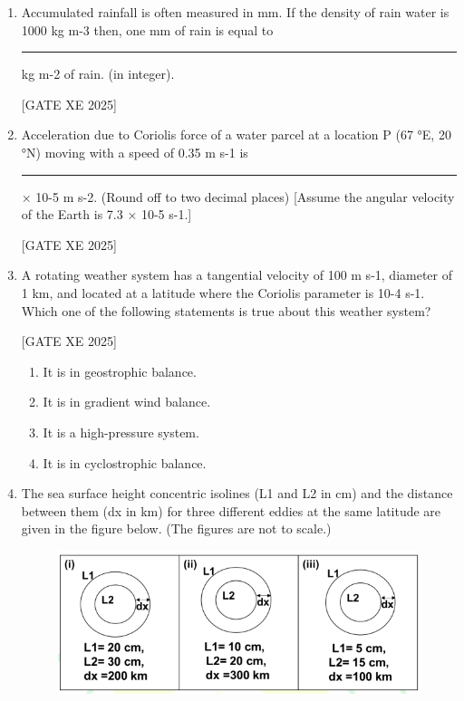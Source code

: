 \documentclass[journal,12pt,onecolumn]{IEEEtran}
\theoremstyle{remark}
\begin{document}
\begin{enumerate}
\hfill[GATE XE 2025]

\begin{multicols}{2}
\begin{enumerate}
\item 5 seconds
\item 20 seconds
\item 5 minutes
\item 2 minutes
\end{enumerate}
\end{multicols}

\item Accumulated rainfall is often measured in mm. If the density of rain water is 1000 kg m-3 then, one mm of rain is equal to \rule{3cm}{0.15mm} kg m-2 of rain. (in integer).

\hfill[GATE XE 2025]

\item Acceleration due to Coriolis force of a water parcel at a location P (67 °E, 20 °N) moving with a speed of 0.35 m s-1 is \rule{3cm}{0.15mm} × 10-5 m s-2. (Round off to two decimal places) [Assume the angular velocity of the Earth is 7.3 × 10-5 s-1.]

\hfill[GATE XE 2025]

\item A rotating weather system has a tangential velocity of 100 m s-1, diameter of 1 km, and located at a latitude where the Coriolis parameter is 10-4 s-1. Which one of the following statements is true about this weather system?

\hfill[GATE XE 2025]

\begin{multicols}{2}
\begin{enumerate}
\item It is in geostrophic balance.
\item It is in gradient wind balance.
\item It is a high-pressure system.
\item It is in cyclostrophic balance.
\end{enumerate}
\end{multicols}

\item The sea surface height concentric isolines (L1 and L2 in cm) and the distance between them (dx in km) for three different eddies at the same latitude are given in the figure below. (The figures are not to scale.)
\begin{figure}[H]
    \centering
    \includegraphics[width=0.5\columnwidth]{figs/fig34.png}
    \caption{}
    \label{fig:placeholder}
\end{figure}


\end{enumerate}
\end{document}

